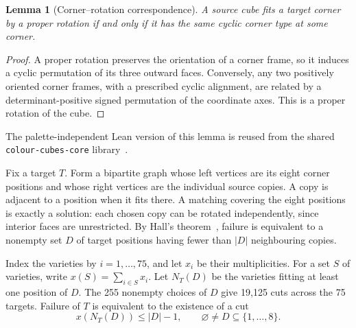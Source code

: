 \documentclass[11pt]{article}
\newtheorem{lemma}[theorem]{Lemma}
\theoremstyle{remark}
\begin{document}
\begin{lemma}[Corner--rotation correspondence]\label{lem:corner}
A source cube fits a target corner by a proper rotation if and only if it
has the same cyclic corner type at some corner.
\end{lemma}
\begin{proof}
A proper rotation preserves the orientation of a corner frame, so it induces
a cyclic permutation of its three outward faces. Conversely, any two
positively oriented corner frames, with a prescribed cyclic alignment,
are related by a determinant-positive signed permutation of the coordinate
axes. This is a proper rotation of the cube.
\end{proof}
The palette-independent Lean version of this lemma is reused from the
shared \texttt{colour-\allowbreak cubes-\allowbreak core} library~\cite{ColourCubes}.

Fix a target $T$. Form a bipartite graph whose left vertices are its eight
corner positions and whose right vertices are the individual source copies.
A copy is adjacent to a position when it fits there. A matching covering
the eight positions is exactly a solution: each chosen copy can be rotated
independently, since interior faces are unrestricted. By Hall's
theorem~\cite{Hall}, failure is equivalent to a nonempty set $D$ of target
positions having fewer than $|D|$ neighbouring copies.

Index the varieties by $i=1,\ldots,75$, and let $x_i$ be their multiplicities.
For a set $S$ of varieties, write $x(S)=\sum_{i\in S}x_i$.
Let $N_T(D)$ be the varieties fitting at least one position of $D$.
The 255 nonempty choices of $D$ give 19,125 cuts across the 75 targets.
Failure of $T$ is equivalent to the existence of a cut
\begin{equation}\label{eq:hall}
  x(N_T(D))\le |D|-1,\qquad \varnothing\ne D\subseteq\{1,\ldots,8\}.
\end{equation}
\end{document}
